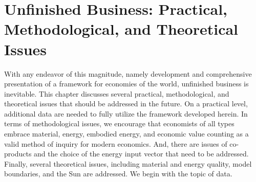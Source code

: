 %
%
%

\chapter{Unfinished Business: Practical, Methodological, and Theoretical Issues}
\label{chap:unfinished_business}





With any endeavor of this magnitude, 
namely development and comprehensive presentation 
of a framework for economies of the world,
unfinished business is inevitable. 
This chapter discusses several 
practical, methodological, and theoretical issues
that should be addressed in the future.
On a practical level, additional data are needed 
to fully utilize the framework developed herein.
In terms of methodological issues, we encourage that economists of all types
embrace material, energy, embodied energy, and economic value counting 
as a valid method of inquiry for modern economics.
And, there are issues of co-products and the choice of the energy input vector
that need to be addressed.  
Finally, several theoretical issues, including
material and energy quality, 
model boundaries, and 
the Sun
are addressed.
We begin with the topic of data.



